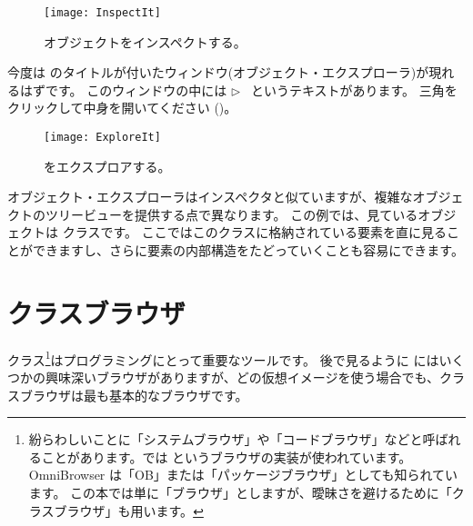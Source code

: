\documentclass[a4paper,10pt,twoside]{book}
\begin{document}
\begin{figure}[htb]
\centerline {\texttt{[image: InspectIt]}}
\caption{オブジェクトをインスペクトする。}
\end{figure}



今度は  のタイトルが付いたウィンドウ(オブジェクト・エクスプローラ)が現れるはずです。
このウィンドウの中には \mbox{$\triangleright$ } というテキストがあります。
三角をクリックして中身を開いてください ()。

\begin{figure}[htb]
\centerline {\texttt{[image: ExploreIt]}}
\caption{ をエクスプロアする。}
\end{figure}

オブジェクト・エクスプローラはインスペクタと似ていますが、複雑なオブジェクトのツリービューを提供する点で異なります。
この例では、見ているオブジェクトは  クラスです。
ここではこのクラスに格納されている要素を直に見ることができますし、さらに要素の内部構造をたどっていくことも容易にできます。

\section{クラスブラウザ}

クラス\footnote{紛らわしいことに「システムブラウザ」や「コードブラウザ」などと呼ばれることがあります。\pharo では  というブラウザの実装が使われています。OmniBrowser は「OB」または「パッケージブラウザ」としても知られています。
この本では単に「ブラウザ」としますが、曖昧さを避けるために「クラスブラウザ」も用います。}はプログラミングにとって重要なツールです。
後で見るように \pharo にはいくつかの興味深いブラウザがありますが、どの仮想イメージを使う場合でも、クラスブラウザは最も基本的なブラウザです。

\end{document}

